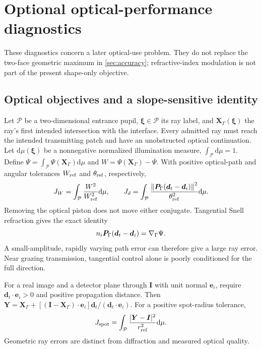 \section{Optional optical-performance diagnostics}\label{sec:optional-optics}

These diagnostics concern a later optical-use problem. They do not replace the
two-face geometric maximum in \cref{sec:accuracy}; refractive-index modulation
is not part of the present shape-only objective.

\subsection{Optical objectives and a slope-sensitive identity}
Let $\mathcal P$ be a two-dimensional entrance pupil, $\bm\xi\in\mathcal P$ its
ray label, and $\bm X_\Gamma(\bm\xi)$ the ray's first intended intersection with
the interface. Every admitted ray must reach the intended transmitting patch
and have an unobstructed optical continuation. Let $\mathrm d\mu(\bm\xi)$ be a
nonnegative normalized illumination measure, $\int_{\mathcal P}\mathrm d\mu=1$.
Define $\overline\Psi=\int_{\mathcal P}\Psi(\bm X_\Gamma)\mathrm d\mu$ and
$W=\Psi(\bm X_\Gamma)-\overline\Psi$. With positive optical-path and angular
tolerances $W_{\rm ref}$ and $\theta_{\rm ref}$, respectively,
\begin{equation}
 J_W=\int_{\mathcal P}\frac{W^2}{W_{\rm ref}^2}\mathrm d\mu,
 \qquad J_d=\int_{\mathcal P}
 \frac{\left\lVert\bm P_\Gamma(\bm d_t-\bm d_i)\right\rVert^2}{\theta_{\rm ref}^2}\mathrm d\mu.
 \label{eq:optical-objectives}
\end{equation}
Removing the optical piston does not move either conjugate. Tangential Snell
refraction gives the exact identity
\begin{equation}
 n_i\bm P_\Gamma(\bm d_t-\bm d_i)=\nabla_\Gamma\Psi.
 \label{eq:opd-slope-identity}
\end{equation}
A small-amplitude, rapidly varying path error can therefore give a large ray
error. Near grazing transmission, tangential control alone is poorly
conditioned for the full direction.

For a real image and a detector plane through $\bm I$ with unit normal
$\bm e_i$, require $\bm d_t\cdot\bm e_i>0$ and positive propagation distance.
Then $\bm Y=\bm X_\Gamma+[(\bm I-\bm X_\Gamma)\cdot\bm e_i]
\bm d_t/(\bm d_t\cdot\bm e_i)$. For a positive spot-radius tolerance,
\begin{equation}
 J_{\rm spot}=\int_{\mathcal P}\frac{|\bm Y-\bm I|^2}{r_{\rm ref}^2}\mathrm d\mu.
 \label{eq:spot-cost}
\end{equation}
Geometric ray errors are distinct from diffraction and measured optical quality.

